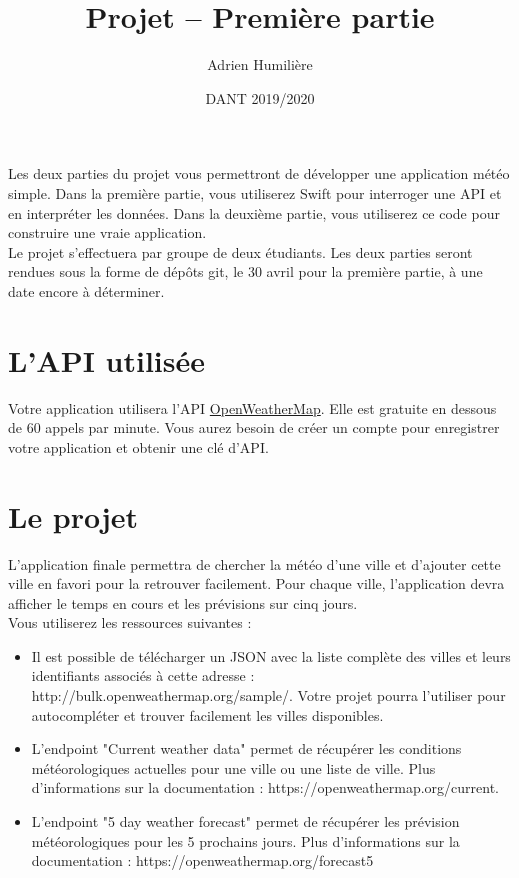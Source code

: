 \documentclass[a4paper,11pt]{scrartcl}
\begin{document}
\newcommand{\mytitle}{\textsf{\textbf{Projet – Première partie}}}
\title{\mytitle}
\author{Adrien Humilière}
\date{DANT 2019/2020}

\maketitle

Les deux parties du projet vous permettront de développer une application météo simple. Dans la première partie, vous utiliserez Swift pour interroger une API et en interpréter les données. Dans la deuxième partie, vous utiliserez ce code pour construire une vraie application.\\

Le projet s'effectuera par groupe de deux étudiants. Les deux parties seront rendues sous la forme de dépôts git, le 30 avril pour la première partie, à une date encore à déterminer.

\section*{L'API utilisée}

Votre application utilisera l'API \href{https://openweathermap.org/api}{OpenWeatherMap}. Elle est gratuite en dessous de 60 appels par minute. Vous aurez besoin de créer un compte pour enregistrer votre application et obtenir une clé d'API. 

\section*{Le projet}

L'application finale permettra de chercher la météo d'une ville et d'ajouter cette ville en favori pour la retrouver facilement. Pour chaque ville, l'application devra afficher le temps en cours et les prévisions sur cinq jours.\\

Vous utiliserez les ressources suivantes :
\begin{itemize}
\item Il est possible de télécharger un JSON avec la liste complète des villes et leurs identifiants associés à cette adresse : http://bulk.openweathermap.org/sample/. Votre projet pourra l'utiliser pour autocompléter et trouver facilement les villes disponibles.
\item L'endpoint "Current weather data" permet de récupérer les conditions météorologiques actuelles pour une ville ou une liste de ville. Plus d'informations sur la documentation : https://openweathermap.org/current.
\item L'endpoint "5 day weather forecast" permet de récupérer les prévision météorologiques pour les 5 prochains jours. Plus d'informations sur la documentation : https://openweathermap.org/forecast5
\end{itemize}
\end{document}
